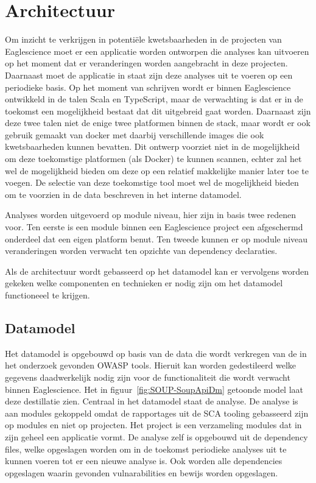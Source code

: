 \chapter{Architectuur}\label{ch:Architectuur}

Om inzicht te verkrijgen in potentiële kwetsbaarheden in de projecten van Eaglescience moet er een applicatie worden ontworpen die analyses kan uitvoeren op het moment dat er veranderingen worden aangebracht in deze projecten. Daarnaast moet de applicatie in staat zijn deze analyses uit te voeren op een periodieke basis.
Op het moment van schrijven wordt er binnen Eaglescience ontwikkeld in de talen Scala en TypeScript, maar de verwachting is dat er in de toekomst een mogelijkheid bestaat dat dit uitgebreid gaat worden. Daarnaast zijn deze twee talen niet de enige twee platformen binnen de stack, maar wordt er ook gebruik gemaakt van docker met daarbij verschillende images die ook kwetsbaarheden kunnen bevatten. Dit ontwerp voorziet niet in de mogelijkheid om deze toekomstige platformen (als Docker) te kunnen scannen, echter zal het wel de mogelijkheid bieden om deze op een relatief makkelijke manier later toe te voegen. De selectie van deze toekomstige tool moet wel de mogelijkheid bieden om te voorzien in de data beschreven in het interne datamodel.

Analyses worden uitgevoerd op module niveau, hier zijn in basis twee redenen voor. Ten eerste is een module binnen een Eaglescience project een afgeschermd onderdeel dat een eigen platform benut. Ten tweede kunnen er op module niveau veranderingen worden verwacht ten opzichte van dependency declaraties.

Als de architectuur wordt gebasseerd op het datamodel kan er vervolgens worden gekeken welke componenten en technieken er nodig zijn om het datamodel functioneeel te krijgen.

\section{Datamodel}\label{subsec:datamodel}
Het datamodel is opgebouwd op basis van de data die wordt verkregen van de in het onderzoek gevonden OWASP tools. Hieruit kan worden gedestileerd welke gegevens daadwerkelijk nodig zijn voor de functionaliteit die wordt verwacht binnen Eaglescience. Het in figuur~\ref{fig:SOUP-SoupApiDm} getoonde model laat deze destillatie zien. Centraal in het datamodel staat de analyse. De analyse is aan modules gekoppeld omdat de rapportages uit de SCA tooling gebasseerd zijn op modules en niet op projecten. Het project is een verzameling modules dat in zijn geheel een applicatie vormt. De analyse zelf is opgebouwd uit de dependency files, welke opgeslagen worden om in de toekomst periodieke analyses uit te kunnen voeren tot er een nieuwe analyse is. Ook worden alle dependencies opgeslagen waarin gevonden vulnarabilities en bewijs worden opgeslagen.


